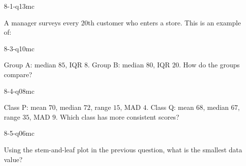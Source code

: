 \begin{practiceQuestion}{8-1-q13}{mc}
\begin{questionText}
A manager surveys every $20$th customer who enters a store. This is an example of:
\end{questionText}
\end{practiceQuestion}

\begin{practiceQuestion}{8-3-q10}{mc}
\begin{questionText}
Group A: median $85$, IQR $8$. Group B: median $80$, IQR $20$. How do the groups compare?
\end{questionText}
\end{practiceQuestion}

\begin{practiceQuestion}{8-4-q08}{mc}
\begin{questionText}
Class P: mean $70$, median $72$, range $15$, MAD $4$.
Class Q: mean $68$, median $67$, range $35$, MAD $9$.
Which class has more consistent scores?
\end{questionText}
\end{practiceQuestion}

\begin{practiceQuestion}{8-5-q06}{mc}
\begin{questionText}
Using the stem-and-leaf plot in the previous question, what is the smallest data value?
\end{questionText}
\end{practiceQuestion}

